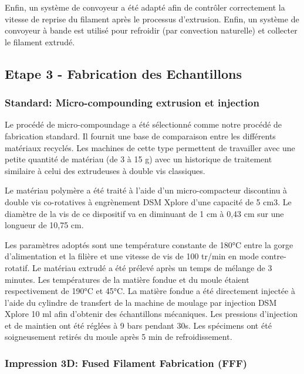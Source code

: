 \documentclass[
]{article}
\begin{document}
Enfin, un système de convoyeur a été adapté afin de contrôler correctement la vitesse de reprise du filament après le processus d'extrusion. Enfin, un système de convoyeur à bande est utilisé pour refroidir (par convection naturelle) et collecter le filament extrudé.

\hypertarget{etape-3---fabrication-des-echantillons}{%
\subsection{Etape 3 - Fabrication des Echantillons}\label{etape-3---fabrication-des-echantillons}}

\hypertarget{standard-micro-compounding-extrusion-et-injection}{%
\subsubsection{Standard: Micro-compounding extrusion et injection}\label{standard-micro-compounding-extrusion-et-injection}}

Le procédé de micro-compoundage a été sélectionné comme notre procédé de fabrication standard. Il fournit une base de comparaison entre les différents matériaux recyclés.
Les machines de cette type permettent de travailler avec une petite quantité de matériau (de 3 à 15 g) avec un historique de traitement similaire à celui des extrudeuses à double vis classiques.

Le matériau polymère a été traité à l'aide d'un micro-compacteur discontinu à double vis co-rotatives à engrènement DSM Xplore d'une capacité de 5 cm3. Le diamètre de la vis de ce dispositif va en diminuant de 1 cm à 0,43 cm sur une longueur de 10,75 cm.

Les paramètres adoptés sont une température constante de 180°C entre la gorge d'alimentation et la filière et une vitesse de vis de 100 tr/min en mode contre-rotatif. Le matériau extrudé a été prélevé après un temps de mélange de 3 minutes. Les températures de la matière fondue et du moule étaient respectivement de 190°C et 45°C. La matière fondue a été directement injectée à l'aide du cylindre de transfert de la machine de moulage par injection DSM Xplore 10 ml afin d'obtenir des échantillons mécaniques. Les pressions d'injection et de maintien ont été réglées à 9 bars pendant 30s. Les spécimens ont été soigneusement retirés du moule après 5 min de refroidissement.

\hypertarget{impression-3d-fused-filament-fabrication-fff}{%
\subsubsection{Impression 3D: Fused Filament Fabrication (FFF)}\label{impression-3d-fused-filament-fabrication-fff}}
\end{document}
